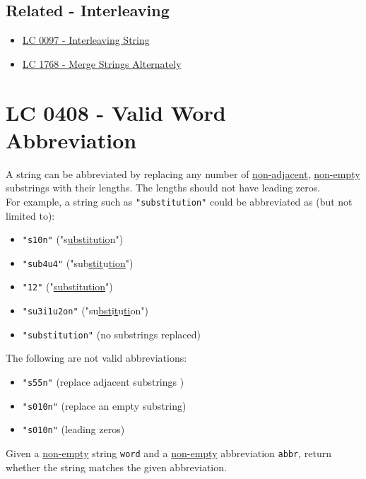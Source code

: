 {\subsection*{Related - Interleaving}
\begin{itemize}
\item \hyperref[lc0097]{LC 0097 - Interleaving String}
\item \hyperref[lc1768]{LC 1768 - Merge Strings Alternately}
\end{itemize}

\section{LC 0408 - Valid Word Abbreviation}
A string can be abbreviated by replacing any number of \ul{non-adjacent}, \ul{non-empty} substrings with their lengths. The lengths should not have leading zeros.\\

For example, a string such as {\colorbox{CodeBackground}{\lstinline|"substitution"|}} could be abbreviated as (but not limited to):
\begin{itemize}
\item  {\colorbox{CodeBackground}{\lstinline|"s10n"|}} ("s\ul{ubstitutio}n")
\item  {\colorbox{CodeBackground}{\lstinline|"sub4u4"|}} ("sub\ul{stit}u\ul{tion}")
\item  {\colorbox{CodeBackground}{\lstinline|"12"|}} ("\ul{substitution}")
\item  {\colorbox{CodeBackground}{\lstinline|"su3i1u2on"|}} ("su\ul{bst}i\ul{t}u\ul{ti}on")
\item {\colorbox{CodeBackground}{\lstinline|"substitution"|}} (no substrings replaced)
\end{itemize}

The following are not valid abbreviations:
\begin{itemize}
\item {\colorbox{CodeBackground}{\lstinline|"s55n"|}} (replace adjacent substrings )
\item {\colorbox{CodeBackground}{\lstinline|"s010n"|}} (replace an empty substring)
\item {\colorbox{CodeBackground}{\lstinline|"s010n"|}} (leading zeros)
\end{itemize}

Given a \ul{non-empty} string {\colorbox{CodeBackground}{\lstinline|word|}} and a \ul{non-empty} abbreviation {\colorbox{CodeBackground}{\lstinline|abbr|}}, return whether the string matches the given abbreviation.\\

}
